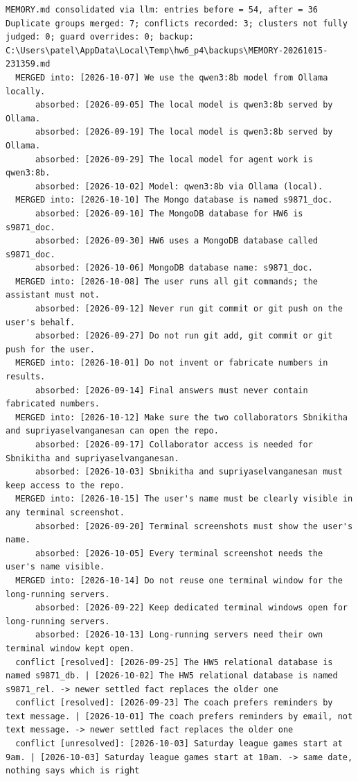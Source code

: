 \documentclass[11pt]{article}
\begin{document}
\begingroup\lstset{basicstyle=\ttfamily\tiny}
\begin{lstlisting}
MEMORY.md consolidated via llm: entries before = 54, after = 36
Duplicate groups merged: 7; conflicts recorded: 3; clusters not fully judged: 0; guard overrides: 0; backup: C:\Users\patel\AppData\Local\Temp\hw6_p4\backups\MEMORY-20261015-231359.md
  MERGED into: [2026-10-07] We use the qwen3:8b model from Ollama locally.
      absorbed: [2026-09-05] The local model is qwen3:8b served by Ollama.
      absorbed: [2026-09-19] The local model is qwen3:8b served by Ollama.
      absorbed: [2026-09-29] The local model for agent work is qwen3:8b.
      absorbed: [2026-10-02] Model: qwen3:8b via Ollama (local).
  MERGED into: [2026-10-10] The Mongo database is named s9871_doc.
      absorbed: [2026-09-10] The MongoDB database for HW6 is s9871_doc.
      absorbed: [2026-09-30] HW6 uses a MongoDB database called s9871_doc.
      absorbed: [2026-10-06] MongoDB database name: s9871_doc.
  MERGED into: [2026-10-08] The user runs all git commands; the assistant must not.
      absorbed: [2026-09-12] Never run git commit or git push on the user's behalf.
      absorbed: [2026-09-27] Do not run git add, git commit or git push for the user.
  MERGED into: [2026-10-01] Do not invent or fabricate numbers in results.
      absorbed: [2026-09-14] Final answers must never contain fabricated numbers.
  MERGED into: [2026-10-12] Make sure the two collaborators Sbnikitha and supriyaselvanganesan can open the repo.
      absorbed: [2026-09-17] Collaborator access is needed for Sbnikitha and supriyaselvanganesan.
      absorbed: [2026-10-03] Sbnikitha and supriyaselvanganesan must keep access to the repo.
  MERGED into: [2026-10-15] The user's name must be clearly visible in any terminal screenshot.
      absorbed: [2026-09-20] Terminal screenshots must show the user's name.
      absorbed: [2026-10-05] Every terminal screenshot needs the user's name visible.
  MERGED into: [2026-10-14] Do not reuse one terminal window for the long-running servers.
      absorbed: [2026-09-22] Keep dedicated terminal windows open for long-running servers.
      absorbed: [2026-10-13] Long-running servers need their own terminal window kept open.
  conflict [resolved]: [2026-09-25] The HW5 relational database is named s9871_db. | [2026-10-02] The HW5 relational database is named s9871_rel. -> newer settled fact replaces the older one
  conflict [resolved]: [2026-09-23] The coach prefers reminders by text message. | [2026-10-01] The coach prefers reminders by email, not text message. -> newer settled fact replaces the older one
  conflict [unresolved]: [2026-10-03] Saturday league games start at 9am. | [2026-10-03] Saturday league games start at 10am. -> same date, nothing says which is right
\end{lstlisting}
\end{document}
